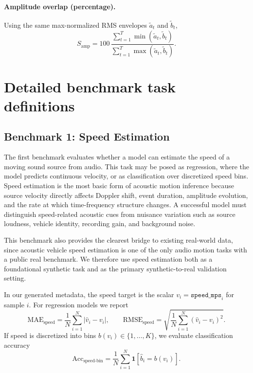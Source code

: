 \documentclass{article}
\begin{document}
\paragraph{Amplitude overlap (percentage).}
Using the same max-normalized RMS envelopes \(\tilde{a}_t\) and \(\tilde{b}_t\),
\begin{equation}
  S_{\mathrm{amp}}=
  100\,
  \frac{\sum_{t=1}^{T}\min(\tilde{a}_t,\tilde{b}_t)}
       {\sum_{t=1}^{T}\max(\tilde{a}_t,\tilde{b}_t)}.
\end{equation}

\section{Detailed benchmark task definitions}
\label{supp:benchmark-definitions}

\subsection{Benchmark 1: Speed Estimation}

The first benchmark evaluates whether a model can estimate the speed of a moving sound source from audio. This task may be posed as regression, where the model predicts continuous velocity, or as classification over discretized speed bins. Speed estimation is the most basic form of acoustic motion inference because source velocity directly affects Doppler shift, event duration, amplitude evolution, and the rate at which time-frequency structure changes. A successful model must distinguish speed-related acoustic cues from nuisance variation such as source loudness, vehicle identity, recording gain, and background noise.

This benchmark also provides the clearest bridge to existing real-world data, since acoustic vehicle speed estimation is one of the only audio motion tasks with a public real benchmark. We therefore use speed estimation both as a foundational synthetic task and as the primary synthetic-to-real validation setting.

In our generated metadata, the speed target is the scalar \(v_i=\texttt{speed\_mps}_i\) for sample \(i\). For regression models we report
\begin{equation}
  \mathrm{MAE}_{\text{speed}}=\frac{1}{N}\sum_{i=1}^{N}\left|\hat v_i-v_i\right|,
  \qquad
  \mathrm{RMSE}_{\text{speed}}=\sqrt{\frac{1}{N}\sum_{i=1}^{N}\left(\hat v_i-v_i\right)^2}.
\end{equation}
If speed is discretized into bins \(b(v_i)\in\{1,\dots,K\}\), we evaluate classification accuracy
\begin{equation}
  \mathrm{Acc}_{\text{speed-bin}}=\frac{1}{N}\sum_{i=1}^{N}\mathbf{1}\!\left[\hat b_i=b(v_i)\right].
\end{equation}
\end{document}
